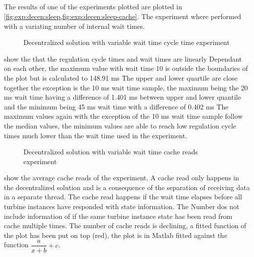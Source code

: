 \subsection{}

The results of one of the  experiments plotted are plotted in \cref{fig:exp:decen:sleep,fig:exp:decen:sleep-cache}.
The experiment where performed with a variating number of internal wait times.

\begin{figure}[h]
	\centering
	
	\caption{Decentralized solution with variable wait time cycle time experiment}
	\label{fig:exp:decen:sleep}
\end{figure}

 show the that the regulation cycle times and wait times are linearly Dependant on each other, the maximum value with wait time 10 is outside the boundaries of the plot but is calculated to 148.91 ms The upper and lower quartile are close together the exception is the 10 ms wait time sample, the maximum being the 20 ms wait time having a difference of 1.401 ms between upper and lower quantile and the minimum being 45 ms wait time with a difference of 0.402 ms The maximum values again with the exception of the 10 ms wait time sample follow the median values, the minimum values are able to reach low regulation cycle times much lower than the wait time used in the experiment.

\begin{figure}[h]
	\centering
	
	\caption{Decentralized solution with variable wait time cache reads experiment}
	\label{fig:exp:decen:sleep-cache}
\end{figure}

 show the average cache reads of the experiment.
A cache read only happens in the decentralized solution and is a consequence of the separation of receiving data in a separate thread.
The cache read happens if the wait time elapses before all turbine instances have responded with state information. The Number dos not include information of if the same turbine instance state has been read from cache multiple times.
The number of cache reads is declining, a fitted function of the plot has been put on top (red), the plot is in Matlab fitted against the function $\dfrac{a}{x + b} + c$.

\clearpage
